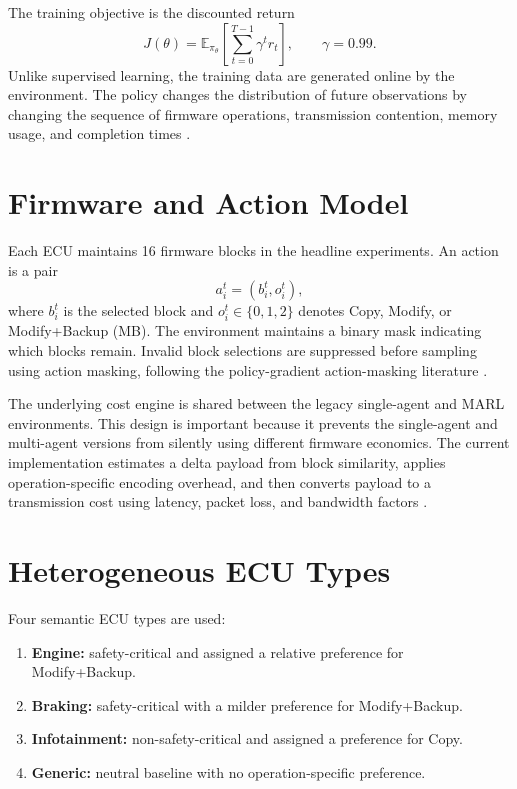 \documentclass{iutbscthesis}
\begin{document}
The training objective is the discounted return
\begin{equation}
J(\theta)=\mathbb{E}_{\pi_\theta}\left[\sum_{t=0}^{T-1}\gamma^t r_t\right],\qquad \gamma=0.99.
\end{equation}
Unlike supervised learning, the training data are generated online by the environment. The policy changes the distribution of future observations by changing the sequence of firmware operations, transmission contention, memory usage, and completion times \parencite{sutton2018rl}.

\section{Firmware and Action Model}
Each ECU maintains 16 firmware blocks in the headline experiments. An action is a pair
\begin{equation}
a_i^t=(b_i^t,o_i^t),
\end{equation}
where $b_i^t$ is the selected block and $o_i^t\in\{0,1,2\}$ denotes Copy, Modify, or Modify+Backup (MB). The environment maintains a binary mask indicating which blocks remain. Invalid block selections are suppressed before sampling using action masking, following the policy-gradient action-masking literature \parencite{huang2022masking}.

The underlying cost engine is shared between the legacy single-agent and MARL environments. This design is important because it prevents the single-agent and multi-agent versions from silently using different firmware economics. The current implementation estimates a delta payload from block similarity, applies operation-specific encoding overhead, and then converts payload to a transmission cost using latency, packet loss, and bandwidth factors \parencite{ma_reles_ota_repo}.

\section{Heterogeneous ECU Types}
Four semantic ECU types are used:
\begin{enumerate}[leftmargin=*]
    \item \textbf{Engine:} safety-critical and assigned a relative preference for Modify+Backup.
    \item \textbf{Braking:} safety-critical with a milder preference for Modify+Backup.
    \item \textbf{Infotainment:} non-safety-critical and assigned a preference for Copy.
    \item \textbf{Generic:} neutral baseline with no operation-specific preference.
\end{enumerate}
\end{document}
